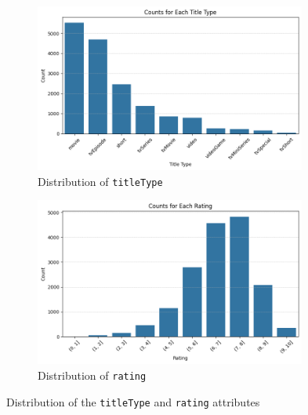 \begin{figure}[H]
    \centering
    \begin{subfigure}{0.49\textwidth}
        \centering
        \includegraphics[width=0.98\textwidth]{plots/types_count.png}     %
        \caption{Distribution of \texttt{titleType}}
        \captionsetup{width=0.9\linewidth, justification=centering}
        \label{fig:titleType_distrib}
    \end{subfigure}
    \begin{subfigure}{0.49\textwidth}
        \centering
        \includegraphics[width=0.98\textwidth]{plots/rating_distrib.png}     %
        \caption{Distribution of \texttt{rating}}
        \captionsetup{width=0.9\linewidth, justification=centering}
        \label{fig:rating_distrib}
    \end{subfigure}
    \captionsetup{justification=centering}
    \caption{Distribution of the \texttt{titleType} and \texttt{rating} attributes}
    \label{fig:distrib}
\end{figure}


